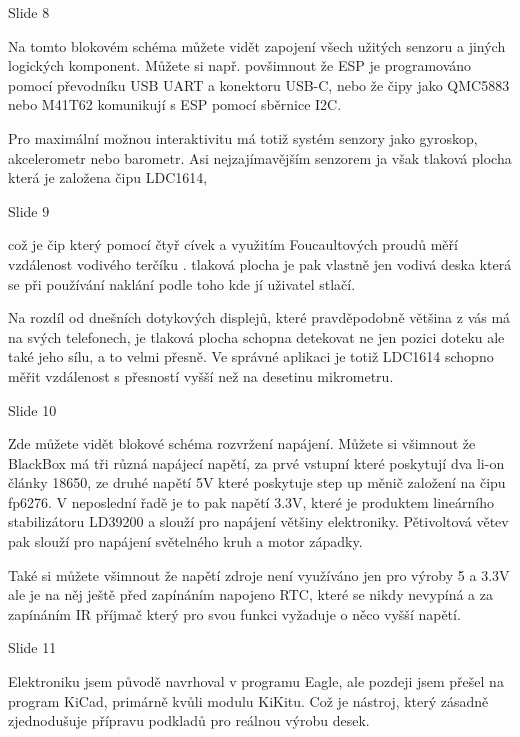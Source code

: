 
Slide 8

Na tomto blokovém schéma můžete vidět zapojení všech užitých senzoru a jiných logických komponent.
Můžete si např. povšimnout že ESP je programováno pomocí převodníku USB UART a konektoru USB-C,
nebo že čipy jako QMC5883 nebo M41T62 komunikují s ESP pomocí sběrnice I2C.

Pro maximální možnou interaktivitu má totiž systém senzory jako gyroskop, akcelerometr nebo barometr. 
Asi nejzajímavějším senzorem ja však tlaková plocha která je založena čipu LDC1614, 


Slide 9

což je čip který 
pomocí čtyř cívek a využitím Foucaultových proudů měří vzdálenost vodivého terčíku . tlaková plocha je pak vlastně 
jen vodivá deska která se při používání naklání podle toho kde jí uživatel stlačí. 

Na rozdíl od dnešních dotykových displejů,
které pravděpodobně většina z vás má na svých telefonech, je tlaková plocha schopna detekovat ne jen pozici doteku ale také jeho sílu,
a to velmi přesně. Ve správné aplikaci je totiž LDC1614 schopno měřit vzdálenost s přesností vyšší než na desetinu mikrometru.


Slide 10

Zde můžete vidět blokové schéma rozvržení napájení.
Můžete si všimnout že BlackBox má tři různá napájecí napětí, za prvé vstupní které poskytují dva li-on články 18650, 
ze druhé napětí 5V které poskytuje step up měnič založení na čipu fp6276. V neposlední řadě je to pak napětí 3.3V,
které je produktem lineárního stabilizátoru LD39200 a slouží pro napájení většiny elektroniky.
Pětivoltová větev pak slouží pro napájení světelného kruh a motor západky.

Také si můžete všimnout že napětí zdroje není využíváno jen pro výroby 5 a 3.3V ale je na něj ještě před zapínáním 
napojeno RTC, které se nikdy nevypíná a za zapínáním IR příjmač který pro svou funkci vyžaduje o něco vyšší napětí.


Slide 11

Elektroniku jsem původě navrhoval v programu Eagle, ale pozdeji jsem přešel na program KiCad, primárně kvůli 
modulu KiKitu. Což je nástroj, který zásadně zjednodušuje přípravu podkladů pro reálnou výrobu desek. 

